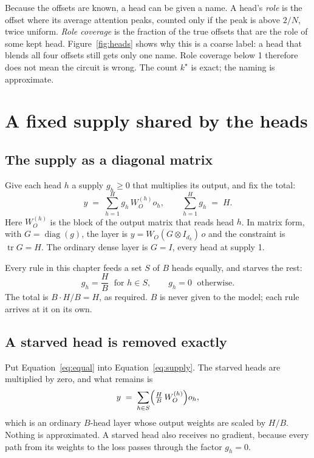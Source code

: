 \documentclass[11pt]{report}
\newcommand{\kstar}{k^\star}
\begin{document}
Because the offsets are known, a head can be given a name. A head's \emph{role} is the
offset where its average attention peaks, counted only if the peak is above $2/N$, twice
uniform. \emph{Role coverage} is the fraction of the true offsets that are the role of
some kept head. Figure~\ref{fig:heads} shows why this is a coarse label: a head that
blends all four offsets still gets only one name. Role coverage below 1 therefore does not
mean the circuit is wrong. The count $\kstar$ is exact; the naming is approximate.

\section{A fixed supply shared by the heads}
\label{sec:supply}

\subsection{The supply as a diagonal matrix}

Give each head $h$ a supply $g_h \ge 0$ that multiplies its output, and fix the total:
\begin{equation}
  y \;=\; \sum_{h=1}^{H} g_h\, W_O^{(h)} o_h ,
  \qquad
  \sum_{h=1}^{H} g_h \;=\; H .
  \label{eq:supply}
\end{equation}
Here $W_O^{(h)}$ is the block of the output matrix that reads head $h$. In matrix form,
with $G = \operatorname{diag}(g)$, the layer is $y = W_O (G \otimes I_{d_k})\, o$ and the
constraint is $\operatorname{tr} G = H$. The ordinary dense layer is $G = I$, every head
at supply 1.

Every rule in this chapter feeds a set $S$ of $B$ heads equally, and starves the rest:
\begin{equation}
  g_h = \frac{H}{B} \;\text{ for } h \in S, \qquad g_h = 0 \;\text{ otherwise}.
  \label{eq:equal}
\end{equation}
The total is $B \cdot H/B = H$, as required. $B$ is never given to the model; each rule
arrives at it on its own.

\subsection{A starved head is removed exactly}

Put Equation~\eqref{eq:equal} into Equation~\eqref{eq:supply}. The starved heads are
multiplied by zero, and what remains is
\begin{equation}
  y \;=\; \sum_{h \in S} \Bigl(\tfrac{H}{B}\, W_O^{(h)}\Bigr) o_h ,
\end{equation}
which is an ordinary $B$-head layer whose output weights are scaled by $H/B$. Nothing is
approximated. A starved head also receives no gradient, because every path from its
weights to the loss passes through the factor $g_h = 0$.
\end{document}
